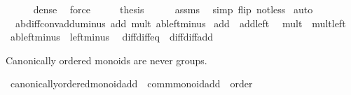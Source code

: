 \begin{isabellebody}
\ \ \ \ \isamarkupfalse%
\ dense\ \isamarkupfalse%
\ force\isanewline
\ \ \isamarkupfalse%
\ \isamarkupfalse%
\ {\isacharquery}{\kern0pt}thesis\isanewline
\ \ \ \ \isamarkupfalse%
\ assms\ \isamarkupfalse%
\ {\isacharparenleft}{\kern0pt}simp\ flip{\isacharcolon}{\kern0pt}\ not{\isacharunderscore}{\kern0pt}less{\isacharparenright}{\kern0pt}\isanewline
{}\isamarkupfalse%
\ auto%
\endisatagproof
{\isafoldproof}%
%
\isadelimproof
\isanewline
%
\endisadelimproof
\isanewline
{}\isamarkupfalse%
\ {\isacharparenleft}{\kern0pt}\ ab{\isacharunderscore}{\kern0pt}diff{\isacharunderscore}{\kern0pt}conv{\isacharunderscore}{\kern0pt}add{\isacharunderscore}{\kern0pt}uminus\ add{\isacharunderscore}{\kern0pt}{}\ mult{\isacharunderscore}{\kern0pt}{}\ ab{\isacharunderscore}{\kern0pt}left{\isacharunderscore}{\kern0pt}minus\isanewline
\isanewline
{}\isamarkupfalse%
\ add{\isacharunderscore}{\kern0pt}{}\ {\isacharequal}{\kern0pt}\ add{\isacharunderscore}{\kern0pt}{}{\isacharunderscore}{\kern0pt}left\ \isanewline
{}\isamarkupfalse%
\ mult{\isacharunderscore}{\kern0pt}{}\ {\isacharequal}{\kern0pt}\ mult{\isacharunderscore}{\kern0pt}{}{\isacharunderscore}{\kern0pt}left\ \isanewline
{}\isamarkupfalse%
\ ab{\isacharunderscore}{\kern0pt}left{\isacharunderscore}{\kern0pt}minus\ {\isacharequal}{\kern0pt}\ left{\isacharunderscore}{\kern0pt}minus\ \isanewline
{}\isamarkupfalse%
\ diff{\isacharunderscore}{\kern0pt}diff{\isacharunderscore}{\kern0pt}eq\ {\isacharequal}{\kern0pt}\ diff{\isacharunderscore}{\kern0pt}diff{\isacharunderscore}{\kern0pt}add%
\isadelimdocument
%
\endisadelimdocument
%
\isatagdocument
%
\isamarkuptrue%
%
\endisatagdocument
{\isafolddocument}%
%
\isadelimdocument
%
\endisadelimdocument
%
\begin{isamarkuptext}%
Canonically ordered monoids are never groups.%
\end{isamarkuptext}\isamarkuptrue%
\isamarkupfalse%
\ canonically{\isacharunderscore}{\kern0pt}ordered{\isacharunderscore}{\kern0pt}monoid{\isacharunderscore}{\kern0pt}add\ {\isacharequal}{\kern0pt}\ comm{\isacharunderscore}{\kern0pt}monoid{\isacharunderscore}{\kern0pt}add\ {\isacharplus}{\kern0pt}\ order\ {\isacharplus}{\kern0pt}\isanewline

\end{isabellebody}
